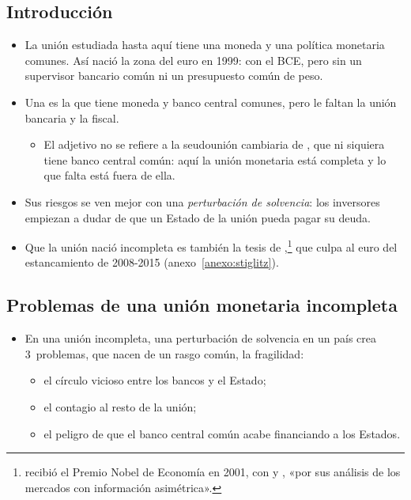 \documentclass[11pt]{article}
\begin{document}
\subsection{Introducción}\label{sec:incompletas-intro}

\begin{itemize}
\item La unión estudiada hasta aquí tiene una moneda y una política monetaria comunes. Así nació la zona del euro en 1999: con el BCE, pero sin un supervisor bancario común ni un presupuesto común de peso.
\item Una  es la que tiene moneda y banco central comunes, pero le faltan la unión bancaria y la fiscal\nocite{DeGrauwe2022Economics}.
  \begin{itemize}
  \item El adjetivo no se refiere a la seudounión cambiaria de , que ni siquiera tiene banco central común: aquí la unión monetaria está completa y lo que falta está fuera de ella.
  \end{itemize}
\item Sus riesgos se ven mejor con una \emph{perturbación de solvencia}: los inversores empiezan a dudar de que un Estado de la unión pueda pagar su deuda.
\item Que la unión nació incompleta es también la tesis de \textcite{Stiglitz2016Euro},\footnote{ recibió el Premio Nobel de Economía en 2001, con  y , «por sus análisis de los mercados con información asimétrica»\nocite{Nobel2001AkerlofSpenceStiglitz}.} que culpa al euro del estancamiento de 2008-2015 (anexo~\ref{anexo:stiglitz}).
\end{itemize}

\subsection{Problemas de una unión monetaria incompleta}\label{sec:problemas-incompleta}

\begin{itemize}
\item En una unión incompleta, una perturbación de solvencia en un país crea 3~problemas, que nacen de un rasgo común, la fragilidad:
  \begin{itemize}
  \item el círculo vicioso entre los bancos y el Estado;
  \item el contagio al resto de la unión;
  \item el peligro de que el banco central común acabe financiando a los Estados.
  \end{itemize}
\end{itemize}
\end{document}

